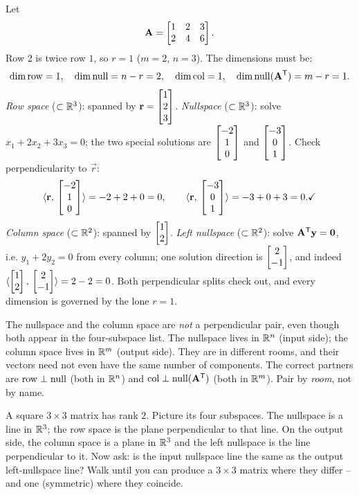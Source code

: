 \begin{example}\label{ch16:four-numeric}
Let
\[
  \mathbf{A} = \begin{bmatrix} 1 & 2 & 3 \\ 2 & 4 & 6 \end{bmatrix}.
\]
Row $2$ is twice row $1$, so $r=1$ ($m=2$, $n=3$). The dimensions must be:
\[
  \operatorname{dim}\operatorname{row} = 1,\quad \operatorname{dim}\operatorname{null} = n-r = 2,\quad
  \operatorname{dim}\operatorname{col} = 1,\quad \operatorname{dim}\operatorname{null}(\mathbf{A}^{\mathsf{T}}) = m-r = 1.
\]
\emph{Row space} ($\subset \mathbb{R}^3$): spanned by $\mathbf{r}=\begin{bmatrix}1\\2\\3\end{bmatrix}$.
\emph{Nullspace} ($\subset \mathbb{R}^3$): solve $x_1 + 2x_2 + 3x_3 = 0$; the two special
solutions are $\begin{bmatrix}-2\\1\\0\end{bmatrix}$ and $\begin{bmatrix}-3\\0\\1\end{bmatrix}$. Check perpendicularity
to $\vec{r}$:
\[
  \langle \mathbf{r},\, \begin{bmatrix}-2\\1\\0\end{bmatrix} \rangle = -2+2+0 = 0,\qquad
  \langle \mathbf{r},\, \begin{bmatrix}-3\\0\\1\end{bmatrix} \rangle = -3+0+3 = 0. \checkmark
\]
\emph{Column space} ($\subset \mathbb{R}^2$): spanned by $\begin{bmatrix}1\\2\end{bmatrix}$.
\emph{Left nullspace} ($\subset \mathbb{R}^2$): solve $\mathbf{A}^{\mathsf{T}}\mathbf{y}=\mathbf{0}$, i.e.
$y_1 + 2y_2 = 0$ from every column; one solution direction is $\begin{bmatrix}2\\-1\end{bmatrix}$,
and indeed $\langle \begin{bmatrix}1\\2\end{bmatrix},\, \begin{bmatrix}2\\-1\end{bmatrix} \rangle = 2-2 = 0$. \checkmark Both
perpendicular splits check out, and every dimension is governed by the lone
$r=1$.
\end{example}

\begin{trapbox}
The nullspace and the column space are \emph{not} a perpendicular pair, even
though both appear in the four-subspace list. The nullspace lives in $\mathbb{R}^n$
(input side); the column space lives in $\mathbb{R}^m$ (output side). They are in
different rooms, and their vectors need not even have the same number of
components. The correct
partners are $\operatorname{row} \perp \operatorname{null}$ (both in $\mathbb{R}^n$) and
$\operatorname{col} \perp \operatorname{null}(\mathbf{A}^{\mathsf{T}})$ (both in $\mathbb{R}^m$). Pair by \emph{room}, not by name.
\end{trapbox}

\begin{walkbox}
A square $3\times 3$ matrix has rank $2$. Picture its four subspaces. The
nullspace is a line in $\mathbb{R}^3$; the row space is the plane perpendicular to that
line. On the output side, the column space is a plane in $\mathbb{R}^3$ and the left
nullspace is the line perpendicular to it. Now ask: is the input nullspace line
the same as the output left-nullspace line? Walk until you can produce a $3\times3$
matrix where they differ -- and one (symmetric) where they coincide.
\end{walkbox}

